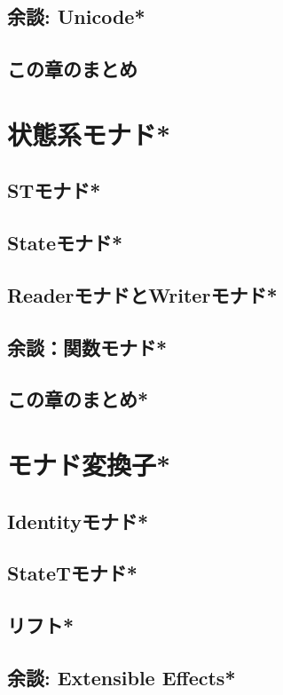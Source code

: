 \documentclass[a5paper,twoside,fleqn,draft]{jsbook}
\begin{document}
\section{余談: Unicode*}
\section{この章のまとめ}

\chapter{状態系モナド*}
\section{STモナド*}
\section{Stateモナド*}
\section{ReaderモナドとWriterモナド*}
\section{余談：関数モナド*}
\section{この章のまとめ*}

\chapter{モナド変換子*}
\section{Identityモナド*}
\section{StateTモナド*}
\section{リフト*}
\section{余談: Extensible Effects*}
\end{document}
